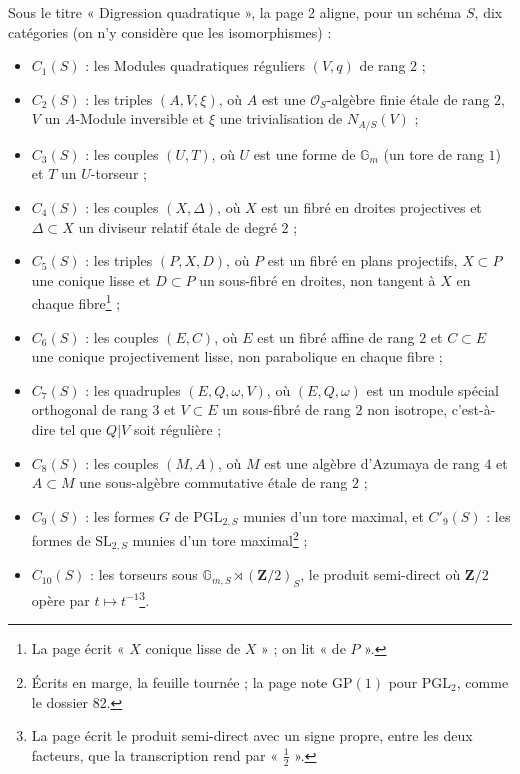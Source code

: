 \documentclass[11pt,a4paper]{article}
\begin{document}
Sous le titre « Digression quadratique », la page 2 aligne, pour un schéma $S$,
dix catégories (on n'y considère que les isomorphismes) :
\begin{itemize}
  \item $C_1(S)$ : les Modules quadratiques réguliers $(V, q)$ de rang $2$ ;
  \item $C_2(S)$ : les triples $(A, V, \xi)$, où $A$ est une $\mathcal{O}_S$-algèbre
    finie étale de rang $2$, $V$ un $A$-Module inversible et $\xi$ une
    trivialisation de $N_{A/S}(V)$ ;
  \item $C_3(S)$ : les couples $(U, T)$, où $U$ est une forme de $\mathbb{G}_m$ (un
    tore de rang $1$) et $T$ un $U$-torseur ;
  \item $C_4(S)$ : les couples $(X, \Delta)$, où $X$ est un fibré en droites
    projectives et $\Delta \subset X$ un diviseur relatif étale de degré $2$ ;
  \item $C_5(S)$ : les triples $(P, X, D)$, où $P$ est un fibré en plans
    projectifs, $X \subset P$ une conique lisse et $D \subset P$ un sous-fibré en
    droites, non tangent à $X$ en chaque fibre\footnote{La page écrit
    « $X$ conique lisse de $X$ » ; on lit « de $P$ ».} ;
  \item $C_6(S)$ : les couples $(E, C)$, où $E$ est un fibré affine de rang $2$
    et $C \subset E$ une conique projectivement lisse, non parabolique en chaque
    fibre ;
  \item $C_7(S)$ : les quadruples $(E, Q, \omega, V)$, où $(E, Q, \omega)$ est un
    module spécial orthogonal de rang $3$ et $V \subset E$ un sous-fibré de rang
    $2$ non isotrope, c'est-à-dire tel que $Q|V$ soit régulière ;
  \item $C_8(S)$ : les couples $(M, A)$, où $M$ est une algèbre d'Azumaya de rang
    $4$ et $A \subset M$ une sous-algèbre commutative étale de rang $2$ ;
  \item $C_9(S)$ : les formes $G$ de $\mathrm{PGL}_{2,S}$ munies d'un tore maximal,
    et $C'_9(S)$ : les formes de $\mathrm{SL}_{2,S}$ munies d'un tore
    maximal\footnote{Écrits en marge, la feuille tournée ; la page note
    $\mathrm{GP}(1)$ pour $\mathrm{PGL}_2$, comme le dossier 82.} ;
  \item $C_{10}(S)$ : les torseurs sous $\mathbb{G}_{m,S} \rtimes (\mathbf{Z}/2)_S$, le
    produit semi-direct où $\mathbf{Z}/2$ opère par $t \mapsto t^{-1}$\footnote{La
    page écrit le produit semi-direct avec un signe propre, entre les deux
    facteurs, que la transcription rend par « $\tfrac{1}{2}$ ».}.
\end{itemize}
\end{document}
